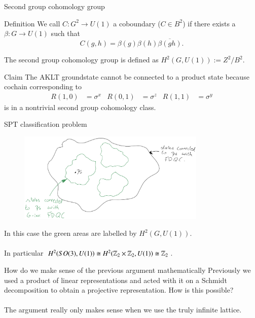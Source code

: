 \documentclass{beamer}
\begin{document}
\begin{frame}{Second group cohomology group}
	\begin{block}{Definition}
		We call $C:G^2\rightarrow U(1)$ a coboundary ($C\in B^2$) if there exists a $\beta:G\rightarrow U(1)$ such that
		\[C(g,h)=\beta(g)\beta(h)\overline{\beta(gh)}.\]
	\end{block}
	The second group cohomology group is defined as $H^2(G,U(1)):=Z^2/B^2$.
	\pause
	\begin{block}{Claim}
		The AKLT groundstate cannot be connected to a product state because cochain corresponding to
		\begin{align*}
			R(1,0)&=\sigma^x&R(0,1)&=\sigma^z&R(1,1)&=\sigma^y
		\end{align*}
		is in a nontrivial second group cohomology class.
	\end{block}
\end{frame}

\begin{frame}{SPT classification problem}
	\begin{figure}
		\center
		\includegraphics[width=0.8\textwidth]{Figures/ConnectedComponents.png}
	\end{figure}
	\pause
	In this case the green areas are labelled by $H^2(G,U(1))$.\\$\:$\\
	In particular $H^2(SO(3),U(1))\cong H^2(\mathbb{Z}_2\times\mathbb{Z}_2,U(1))\cong \mathbb{Z}_2$.
\end{frame}

\begin{frame}{How do we make sense of the previous argument mathematically}
	Previously we used a product of linear representations and acted with it on a Schmidt decomposition to obtain a projective representation. How is this possible?\\$\:$\\
	\pause
	The argument really only makes sense when we use the truly infinite lattice.
\end{frame}
\end{document}
